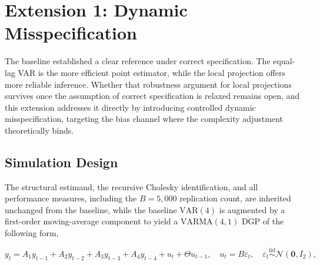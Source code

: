 

\section{Extension 1: Dynamic Misspecification}

The baseline established a clear reference under correct specification. The equal-lag VAR is the 
more efficient point estimator, while the local projection offers more reliable inference. 
Whether that robustness argument for local projections survives once the assumption of correct 
specification is relaxed remains open, and this extension addresses it directly by introducing 
controlled dynamic misspecification, targeting the bias channel where the complexity adjustment 
theoretically binds.

\subsection{Simulation Design}

The structural estimand, the recursive Cholesky identification, and all performance measures, including the $B = 5{,}000$ replication count, are inherited unchanged from the baseline, while the baseline $\text{VAR}(4)$ is augmented by a first-order moving-average component to yield a $\text{VARMA}(4,1)$ DGP of the following form,


\begin{equation}
    y_t = A_1 y_{t-1} + A_2 y_{t-2} + A_3 y_{t-3} + A_4 y_{t-4} 
    + u_t + \Theta u_{t-1}, \quad u_t = B\varepsilon_t, \quad 
    \varepsilon_t \overset{\text{iid}}{\sim} \mathcal{N}(\mathbf{0}, I_2),
\end{equation}

